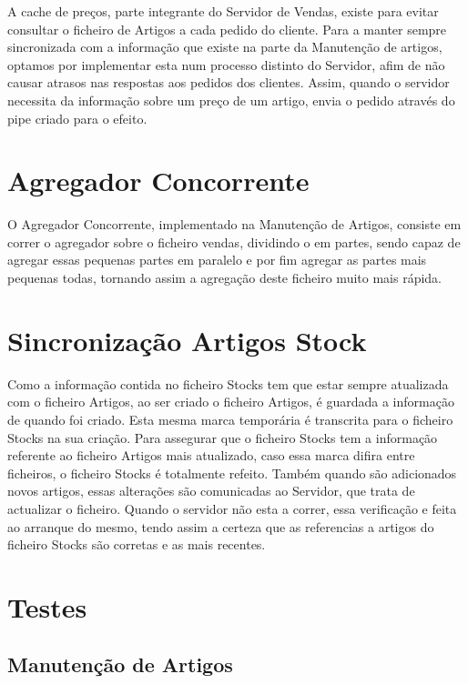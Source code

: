 \documentclass[a4paper]{report}
\begin{document}
A cache de preços, parte integrante do Servidor de Vendas, existe para
evitar consultar o ficheiro de Artigos a cada pedido do cliente.
Para a manter sempre sincronizada com a informação que existe na parte da
Manutenção de artigos, optamos por implementar esta num processo distinto
do Servidor, afim de não causar atrasos nas respostas aos pedidos dos clientes.
Assim, quando o servidor necessita da informação sobre um preço de um artigo,
envia o pedido através do pipe criado para o efeito.

\chapter{Agregador Concorrente}

O Agregador Concorrente, implementado na Manutenção de Artigos, consiste
em correr o agregador sobre o ficheiro vendas, dividindo o em partes, sendo
capaz de agregar essas pequenas partes em paralelo e por fim agregar as 
partes mais pequenas todas, tornando assim a agregação deste ficheiro muito
mais rápida.

\chapter{Sincronização Artigos Stock}

Como a informação contida no ficheiro Stocks tem que estar sempre atualizada
com o ficheiro Artigos, ao ser criado o ficheiro Artigos, é guardada a 
informação de quando foi criado. Esta mesma marca temporária é transcrita para
o ficheiro Stocks na sua criação. Para assegurar que o ficheiro Stocks
tem a informação referente ao ficheiro Artigos mais atualizado, caso essa marca
difira entre ficheiros, o ficheiro Stocks é totalmente refeito. Também quando são
adicionados novos artigos, essas alterações são comunicadas ao Servidor, que trata
de actualizar o ficheiro. Quando o servidor não esta a correr, essa verificação
e feita ao arranque do mesmo, tendo assim a certeza que as referencias a artigos
do ficheiro Stocks são corretas e as mais recentes.

\chapter{Testes}

\section{Manutenção de Artigos}
\end{document}
